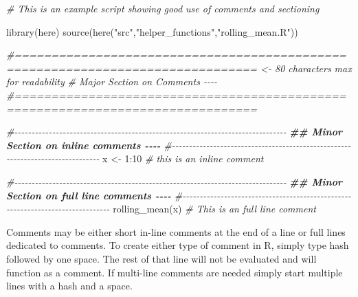 \documentclass[
  12pt,
]{book}
\newenvironment{Shaded}{\begin{snugshade}}{\end{snugshade}}
\newcommand{\CommentTok}[1]{\textcolor[rgb]{0.56,0.35,0.01}{\textit{#1}}}
\newcommand{\DecValTok}[1]{\textcolor[rgb]{0.00,0.00,0.81}{#1}}
\newcommand{\DocumentationTok}[1]{\textcolor[rgb]{0.56,0.35,0.01}{\textbf{\textit{#1}}}}
\newcommand{\FunctionTok}[1]{\textcolor[rgb]{0.00,0.00,0.00}{#1}}
\newcommand{\NormalTok}[1]{#1}
\newcommand{\OtherTok}[1]{\textcolor[rgb]{0.56,0.35,0.01}{#1}}
\newcommand{\SpecialCharTok}[1]{\textcolor[rgb]{0.00,0.00,0.00}{#1}}
\newcommand{\StringTok}[1]{\textcolor[rgb]{0.31,0.60,0.02}{#1}}
\begin{document}
\begin{Shaded}
\begin{Highlighting}[]
\CommentTok{\# This is an example script showing good use of comments and sectioning }

\FunctionTok{library}\NormalTok{(here)}
\FunctionTok{source}\NormalTok{(}\FunctionTok{here}\NormalTok{(}\StringTok{"src"}\NormalTok{,}\StringTok{"helper\_functions"}\NormalTok{,}\StringTok{"rolling\_mean.R"}\NormalTok{))}

\CommentTok{\#===============================================================================  \textless{}{-} 80 characters max for readability}
\CommentTok{\# Major Section on Comments {-}{-}{-}{-}}
\CommentTok{\#===============================================================================}

\CommentTok{\#{-}{-}{-}{-}{-}{-}{-}{-}{-}{-}{-}{-}{-}{-}{-}{-}{-}{-}{-}{-}{-}{-}{-}{-}{-}{-}{-}{-}{-}{-}{-}{-}{-}{-}{-}{-}{-}{-}{-}{-}{-}{-}{-}{-}{-}{-}{-}{-}{-}{-}{-}{-}{-}{-}{-}{-}{-}{-}{-}{-}{-}{-}{-}{-}{-}{-}{-}{-}{-}{-}{-}{-}{-}{-}{-}{-}{-}{-}{-}}
\DocumentationTok{\#\#  Minor Section on inline comments {-}{-}{-}{-} }
\CommentTok{\#{-}{-}{-}{-}{-}{-}{-}{-}{-}{-}{-}{-}{-}{-}{-}{-}{-}{-}{-}{-}{-}{-}{-}{-}{-}{-}{-}{-}{-}{-}{-}{-}{-}{-}{-}{-}{-}{-}{-}{-}{-}{-}{-}{-}{-}{-}{-}{-}{-}{-}{-}{-}{-}{-}{-}{-}{-}{-}{-}{-}{-}{-}{-}{-}{-}{-}{-}{-}{-}{-}{-}{-}{-}{-}{-}{-}{-}{-}{-}}
\NormalTok{x }\OtherTok{\textless{}{-}} \DecValTok{1}\SpecialCharTok{:}\DecValTok{10} \CommentTok{\# this is an inline comment}

\CommentTok{\#{-}{-}{-}{-}{-}{-}{-}{-}{-}{-}{-}{-}{-}{-}{-}{-}{-}{-}{-}{-}{-}{-}{-}{-}{-}{-}{-}{-}{-}{-}{-}{-}{-}{-}{-}{-}{-}{-}{-}{-}{-}{-}{-}{-}{-}{-}{-}{-}{-}{-}{-}{-}{-}{-}{-}{-}{-}{-}{-}{-}{-}{-}{-}{-}{-}{-}{-}{-}{-}{-}{-}{-}{-}{-}{-}{-}{-}{-}{-}}
\DocumentationTok{\#\#  Minor Section on full line comments {-}{-}{-}{-} }
\CommentTok{\#{-}{-}{-}{-}{-}{-}{-}{-}{-}{-}{-}{-}{-}{-}{-}{-}{-}{-}{-}{-}{-}{-}{-}{-}{-}{-}{-}{-}{-}{-}{-}{-}{-}{-}{-}{-}{-}{-}{-}{-}{-}{-}{-}{-}{-}{-}{-}{-}{-}{-}{-}{-}{-}{-}{-}{-}{-}{-}{-}{-}{-}{-}{-}{-}{-}{-}{-}{-}{-}{-}{-}{-}{-}{-}{-}{-}{-}{-}{-}}
\FunctionTok{rolling\_mean}\NormalTok{(x)}
\CommentTok{\# This is an full line comment}
\end{Highlighting}
\end{Shaded}

Comments may be either short in-line comments at the end of a line or full lines dedicated to comments. To create either type of comment in R, simply type hash followed by one space. The rest of that line will not be evaluated and will function as a comment. If multi-line comments are needed simply start multiple lines with a hash and a space.
\end{document}
